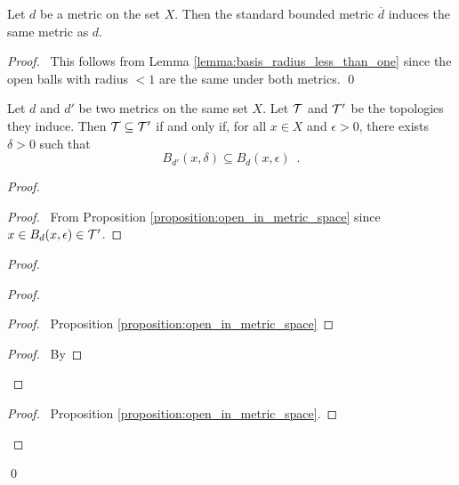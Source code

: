 \begin{proposition}
    \label{proposition:standard_bounded_metric}
    Let $d$ be a metric on the set $X$. Then the standard bounded metric $\overline{d}$ induces the same metric as $d$.
\end{proposition}

\begin{proof}
    \pf\ This follows from Lemma \ref{lemma:basis_radius_less_than_one} since the open balls with radius $< 1$ are the same under both metrics. \qed
\end{proof}

\begin{lemma}
    \label{lemma:metrics_same_topology}
    Let $d$ and $d'$ be two metrics on the same set $X$. Let $\mathcal{T}$ and $\mathcal{T}'$ be the topologies they induce. Then $\mathcal{T} \subseteq \mathcal{T}'$ if and only if,
    for all $x \in X$ and $\epsilon > 0$, there exists $\delta > 0$ such that
    \[ B_{d'}(x, \delta) \subseteq B_d(x, \epsilon) \enspace . \]
\end{lemma}

\begin{proof}
    \pf
    \begin{proof}
        \pf\ From Proposition \ref{proposition:open_in_metric_space} since $x \in B_d(x, \epsilon) \in \mathcal{T}'$.
    \end{proof}
    \begin{proof}
        \begin{proof}
            \begin{proof}
                \pf\ Proposition \ref{proposition:open_in_metric_space}
            \end{proof}
            \begin{proof}
                \pf\ By 
            \end{proof}
        \end{proof}
        \begin{proof}
            \pf\ Proposition \ref{proposition:open_in_metric_space}.
        \end{proof}
    \end{proof}
    \qed
\end{proof}


